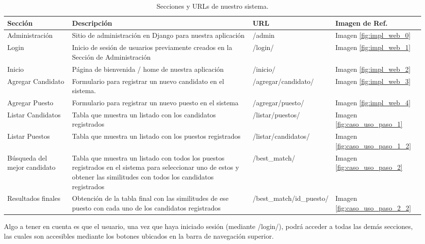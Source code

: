 \documentclass[12pt,a4paper]{article}
\begin{document}
\begin{sloppypar}
\begin{table}[H]
\centering
\begin{tabular}{|p{3cm}||p{6cm}|p{5cm}|p{1.7cm}|}
\hline
\centering \textbf{Sección} & \textbf{Descripción} & \textbf{URL} & \textbf{Imagen de Ref.}  \\ [1ex]
\hline
Administración & Sitio de administración en Django para nuestra aplicación & /admin & Imagen \ref{fig:impl_web_0} \\
\hline
Login & Inicio de sesión de usuarios previamente creados en la Sección de Administración & /login/ & Imagen \ref{fig:impl_web_1}  \\
\hline
Inicio & Página de bienvenida / home de nuestra aplicación & /inicio/ & Imagen \ref{fig:impl_web_2}  \\
\hline
Agregar Candidato & Formulario para registrar un nuevo candidato en el sistema. & /agregar/candidato/ & Imagen \ref{fig:impl_web_3}  \\
\hline
Agregar Puesto & Formulario para registrar un nuevo puesto en el sistema & /agregar/puesto/ & Imagen \ref{fig:impl_web_4}  \\
\hline
Listar Candidatos & Tabla que muestra un listado con los candidatos registrados & /listar/puestos/ & Imagen \ref{fig:caso_uso_paso_1} \\
\hline
Listar Puestos & Tabla que muestra un listado con los puestos registrados  & /listar/candidatos/ & Imagen \ref{fig:caso_uso_paso_1_2} \\
\hline
Búsqueda del mejor candidato & Tabla que muestra un listado con todos los puestos registrados en el sistema para seleccionar uno de estos y obtener las similitudes con todos los candidatos registrados & /best\_match/ & Imagen \ref{fig:caso_uso_paso_2} \\
\hline
Resultados finales & Obtención de la tabla final con las similitudes de ese puesto con cada uno de los candidatos registrados & /best\_match/id\_puesto/ & Imagen \ref{fig:caso_uso_paso_2_2} \\
\hline
\end{tabular}
\caption{Secciones y URLs de nuestro sistema.}
\label{table:secciones_sistema}
\end{table}

Algo a tener en cuenta es que el usuario, una vez que haya iniciado sesión (mediante /login/), podrá acceder a todas las demás secciones, las cuales son accesibles mediante los botones ubicados en la barra de navegación superior.


\end{sloppypar}
\end{document}
